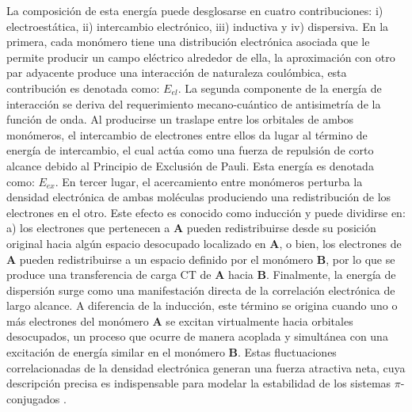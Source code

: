 La composición de esta energía puede desglosarse en cuatro contribuciones: i) electroestática, ii) intercambio electrónico, iii) inductiva y iv) dispersiva. En la primera, cada monómero tiene una distribución electrónica asociada que le permite producir un campo eléctrico alrededor de ella, la aproximación con otro par adyacente produce una interacción de naturaleza coulómbica, esta contribución es denotada como: $E_{el}$. La segunda componente de la energía de interacción se deriva del requerimiento mecano-cuántico de antisimetría de la función de onda. Al producirse un traslape entre los orbitales de ambos monómeros, el intercambio de electrones entre ellos da lugar al término de energía de intercambio, el cual actúa como una fuerza de repulsión de corto alcance debido al Principio de Exclusión de Pauli. Esta energía es denotada como: $E_{ex}$. En tercer lugar, el acercamiento entre monómeros perturba la densidad electrónica de ambas moléculas produciendo una redistribución de los electrones en el otro. Este efecto es conocido como inducción y puede dividirse en: a) los electrones que pertenecen a \textbf{A} pueden redistribuirse desde su posición original hacia algún espacio desocupado localizado en \textbf{A}, o bien, los electrones de \textbf{A} pueden redistribuirse a un espacio definido por el monómero \textbf{B}, por lo que se produce una transferencia de carga CT de \textbf{A} hacia \textbf{B}. Finalmente, la energía de dispersión surge como una manifestación directa de la correlación electrónica de largo alcance. A diferencia de la inducción, este término se origina cuando uno o más electrones del monómero \textbf{A} se excitan virtualmente hacia orbitales desocupados, un proceso que ocurre de manera acoplada y simultánea con una excitación de energía similar en el monómero \textbf{B}. Estas fluctuaciones correlacionadas de la densidad electrónica generan una fuerza atractiva neta, cuya descripción precisa es indispensable para modelar la estabilidad de los sistemas $\pi$-conjugados \cite{kestner1999basis}. \newpage
